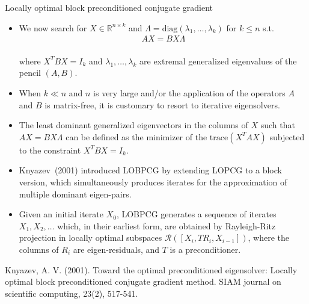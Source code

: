 \documentclass[t,usepdftitle=false]{beamer}
\begin{document}
\begin{frame}{Locally optimal block preconditioned conjugate gradient}
	\begin{itemize}
	\item We now search for $X\in\mathbb{R}^{n\times k}$ and $\Lambda=\mathrm{diag}(\lambda_1,\dots,\lambda_k)$ for $k\leq n$ s.t.\vspace{-.1cm}
	\begin{align*}AX=BX\Lambda\end{align*}
	\vspace{-.7cm}\\
	where $X^TBX=I_k$ and $\lambda_1,\dots,\lambda_k$ are extremal generalized eigenvalues of the pencil $(A,B)$.
	\item When $k\ll n$ and $n$ is very large  and/or the application of the operators $A$ and $B$ is matrix-free, it is customary to resort to iterative eigensolvers.\\
	\item The least dominant generalized eigenvectors in the columns of $X$ such that $AX=BX\Lambda$ can be defined as the minimizer of the $\text{trace}(X^TAX)$ subjected to the constraint $X^TBX=I_k$.
	\item Knyazev~(2001) introduced LOBPCG by extending LOPCG to a block version, which simultaneously produces iterates for the approximation of multiple dominant eigen-pairs.
	\item Given an initial iterate $X_0$, LOBPCG generates a sequence of iterates $X_1,X_2,\dots$ which, in their earliest form, are obtained by Rayleigh-Ritz projection in locally optimal subspaces $\mathcal{R}([X_{i},TR_i,X_{i-1}])$, where the columns of $R_i$ are eigen-residuals, and $T$ is a preconditioner.
	\end{itemize}
	\medskip
	\tiny{Knyazev, A. V. (2001). Toward the optimal preconditioned eigensolver: Locally optimal block preconditioned conjugate gradient method. SIAM journal on scientific computing, 23(2), 517-541.}
\end{frame}
\end{document}
